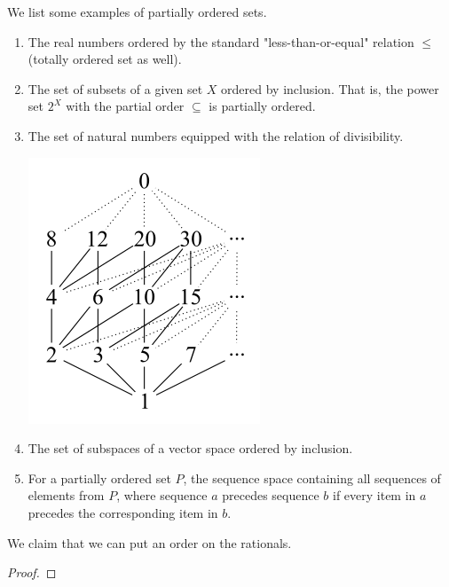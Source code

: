 \documentclass{article}
\begin{document}
      \begin{example}
        We list some examples of partially ordered sets. 
        \begin{enumerate}
          \item The real numbers ordered by the standard "less-than-or-equal" relation $\leq$ (totally ordered set as well). 
          \item The set of subsets of a given set $X$ ordered by inclusion. That is, the power set $2^X$ with the partial order $\subseteq$ is partially ordered. 
          \item The set of natural numbers equipped with the relation of divisibility. 
          \begin{center}
            \includegraphics[scale=0.5]{img/Natural_Numbers_Ordered_by_Divisibility.png}
          \end{center}
          \item The set of subspaces of a vector space ordered by inclusion. 
          \item For a partially ordered set $P$, the sequence space containing all sequences of elements from $P$, where sequence $a$ precedes sequence $b$ if every item in $a$ precedes the corresponding item in $b$. 
        \end{enumerate}
      \end{example}

      \begin{theorem}
        We claim that we can put an order on the rationals. 
      \end{theorem}
      \begin{proof}
        
      \end{proof} 
\end{document}
